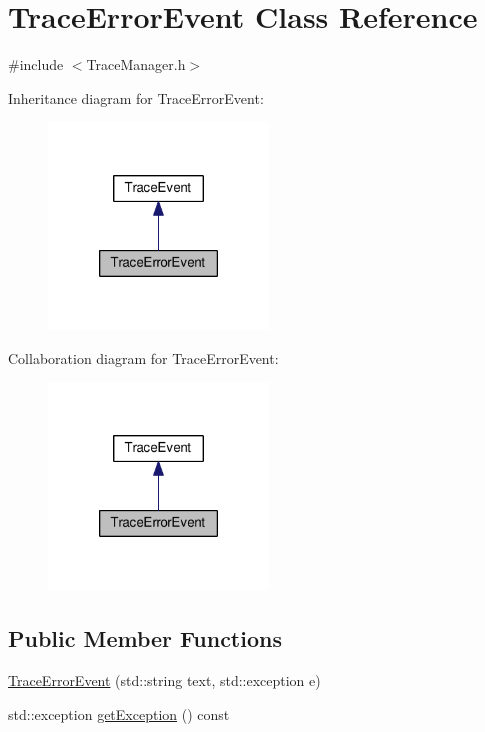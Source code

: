 \hypertarget{class_trace_error_event}{\section{Trace\-Error\-Event Class Reference}
\label{class_trace_error_event}
}


{\ttfamily \#include $<$Trace\-Manager.\-h$>$}



Inheritance diagram for Trace\-Error\-Event\-:\nopagebreak
\begin{figure}[H]
\begin{center}
\leavevmode
\includegraphics[width=166pt]{class_trace_error_event__inherit__graph}
\end{center}
\end{figure}


Collaboration diagram for Trace\-Error\-Event\-:\nopagebreak
\begin{figure}[H]
\begin{center}
\leavevmode
\includegraphics[width=166pt]{class_trace_error_event__coll__graph}
\end{center}
\end{figure}
\subsection*{Public Member Functions}
\begin{DoxyCompactItemize}
\item 
\hyperlink{class_trace_error_event_a0dc19a8fa402afe8d99001f842cd62d2}{Trace\-Error\-Event} (std\-::string text, std\-::exception e)
\item 
std\-::exception \hyperlink{class_trace_error_event_a914c08001f46f73cf5c73f711bd14701}{get\-Exception} () const 
\end{DoxyCompactItemize}


